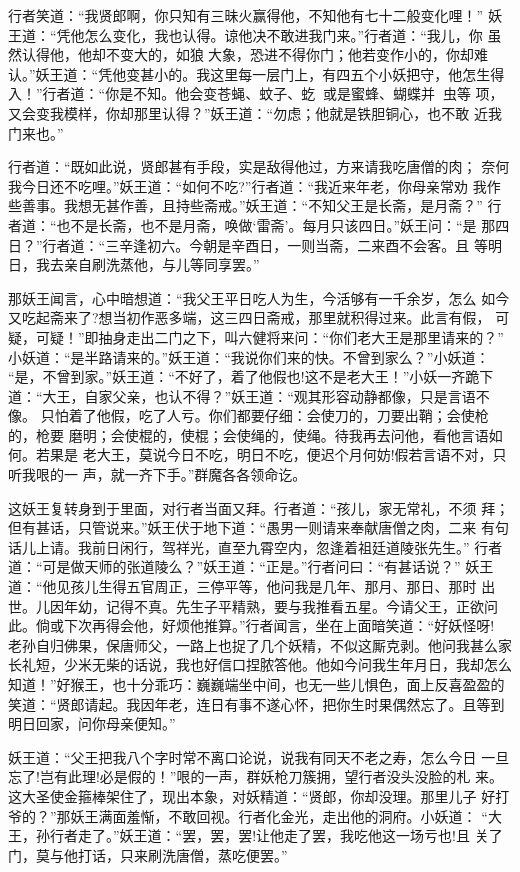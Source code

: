 行者笑道：“我贤郎啊，你只知有三昧火赢得他，不知他有七十二般变化哩！”
妖王道：“凭他怎么变化，我也认得。谅他决不敢进我门来。”行者道：“我儿，你
虽然认得他，他却不变大的，如狼大象，恐进不得你门；他若变作小的，你却难
认。”妖王道：“凭他变甚小的。我这里每一层门上，有四五个小妖把守，他怎生得
入！”行者道：“你是不知。他会变苍蝇、蚊子、虼，或是蜜蜂、蝴蝶并虫等
项，又会变我模样，你却那里认得？”妖王道：“勿虑；他就是铁胆铜心，也不敢
近我门来也。”

行者道：“既如此说，贤郎甚有手段，实是敌得他过，方来请我吃唐僧的肉；
奈何我今日还不吃哩。”妖王道：“如何不吃?”行者道：“我近来年老，你母亲常劝
我作些善事。我想无甚作善，且持些斋戒。”妖王道：“不知父王是长斋，是月斋？”
行者道：“也不是长斋，也不是月斋，唤做‘雷斋’。每月只该四日。”妖王问：“是
那四日？”行者道：“三辛逢初六。今朝是辛酉日，一则当斋，二来酉不会客。且
等明日，我去亲自刷洗蒸他，与儿等同享罢。”

那妖王闻言，心中暗想道：“我父王平日吃人为生，今活够有一千余岁，怎么
如今又吃起斋来了?想当初作恶多端，这三四日斋戒，那里就积得过来。此言有假，
可疑，可疑！”即抽身走出二门之下，叫六健将来问：“你们老大王是那里请来的？”
小妖道：“是半路请来的。”妖王道：“我说你们来的快。不曾到家么？”小妖道：
“是，不曾到家。”妖王道：“不好了，着了他假也!这不是老大王！”小妖一齐跪下
道：“大王，自家父亲，也认不得？”妖王道：“观其形容动静都像，只是言语不像。
只怕着了他假，吃了人亏。你们都要仔细：会使刀的，刀要出鞘；会使枪的，枪要
磨明；会使棍的，使棍；会使绳的，使绳。待我再去问他，看他言语如何。若果是
老大王，莫说今日不吃，明日不吃，便迟个月何妨!假若言语不对，只听我哏的一
声，就一齐下手。”群魔各各领命讫。

这妖王复转身到于里面，对行者当面又拜。行者道：“孩儿，家无常礼，不须
拜；但有甚话，只管说来。”妖王伏于地下道：“愚男一则请来奉献唐僧之肉，二来
有句话儿上请。我前日闲行，驾祥光，直至九霄空内，忽逢着祖廷道陵张先生。”
行者道：“可是做天师的张道陵么？”妖王道：“正是。”行者问曰：“有甚话说？”
妖王道：“他见孩儿生得五官周正，三停平等，他问我是几年、那月、那日、那时
出世。儿因年幼，记得不真。先生子平精熟，要与我推看五星。今请父王，正欲问
此。倘或下次再得会他，好烦他推算。”行者闻言，坐在上面暗笑道：“好妖怪呀!
老孙自归佛果，保唐师父，一路上也捉了几个妖精，不似这厮克剥。他问我甚么家
长礼短，少米无柴的话说，我也好信口捏脓答他。他如今问我生年月日，我却怎么
知道！”好猴王，也十分乖巧：巍巍端坐中间，也无一些儿惧色，面上反喜盈盈的
笑道：“贤郎请起。我因年老，连日有事不遂心怀，把你生时果偶然忘了。且等到
明日回家，问你母亲便知。”

妖王道：“父王把我八个字时常不离口论说，说我有同天不老之寿，怎么今日
一旦忘了!岂有此理!必是假的！”哏的一声，群妖枪刀簇拥，望行者没头没脸的札
来。这大圣使金箍棒架住了，现出本象，对妖精道：“贤郎，你却没理。那里儿子
好打爷的？”那妖王满面羞惭，不敢回视。行者化金光，走出他的洞府。小妖道：
“大王，孙行者走了。”妖王道：“罢，罢，罢!让他走了罢，我吃他这一场亏也!且
关了门，莫与他打话，只来刷洗唐僧，蒸吃便罢。”

